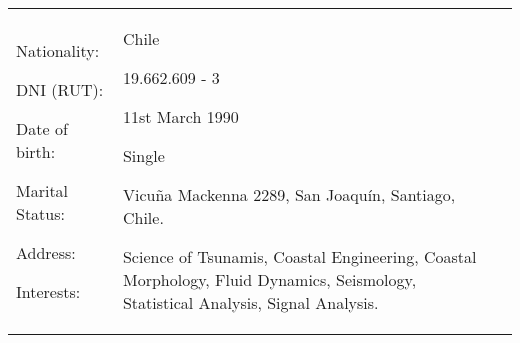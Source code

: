 

\begin{tabularx}{\textwidth}{p{4cm}X X@{}} %
Nationality: \par
DNI (RUT): \par
Date of birth: \par
Marital Status:  \par
Address: \par 
Interests: 
& 
Chile \par
19.662.609 - 3 \par
11st March 1990 \par 
Single \par 
Vicu\~{n}a Mackenna 2289, San Joaquín, Santiago, Chile.\par 
Science of Tsunamis, Coastal Engineering, Coastal Morphology, Fluid Dynamics, Seismology, Statistical Analysis, Signal Analysis. 
\\
\end{tabularx}
